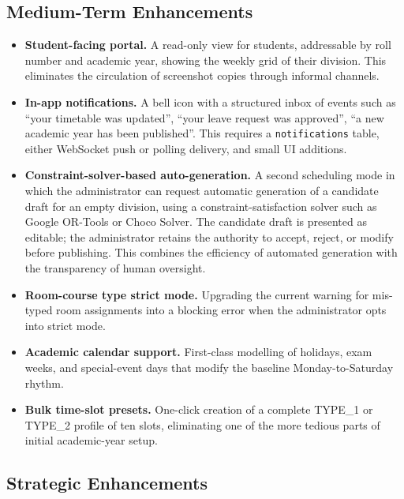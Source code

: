 \subsection{Medium-Term Enhancements}

\begin{itemize}
    \item \textbf{Student-facing portal.} A read-only view for students, addressable by roll number and academic year, showing the weekly grid of their division. This eliminates the circulation of screenshot copies through informal channels.

    \item \textbf{In-app notifications.} A bell icon with a structured inbox of events such as ``your timetable was updated'', ``your leave request was approved'', ``a new academic year has been published''. This requires a \texttt{notifications} table, either WebSocket push or polling delivery, and small UI additions.

    \item \textbf{Constraint-solver-based auto-generation.} A second scheduling mode in which the administrator can request automatic generation of a candidate draft for an empty division, using a constraint-satisfaction solver such as Google OR-Tools or Choco Solver. The candidate draft is presented as editable; the administrator retains the authority to accept, reject, or modify before publishing. This combines the efficiency of automated generation with the transparency of human oversight.

    \item \textbf{Room-course type strict mode.} Upgrading the current warning for mis-typed room assignments into a blocking error when the administrator opts into strict mode.

    \item \textbf{Academic calendar support.} First-class modelling of holidays, exam weeks, and special-event days that modify the baseline Monday-to-Saturday rhythm.

    \item \textbf{Bulk time-slot presets.} One-click creation of a complete TYPE\_1 or TYPE\_2 profile of ten slots, eliminating one of the more tedious parts of initial academic-year setup.
\end{itemize}

\subsection{Strategic Enhancements}

